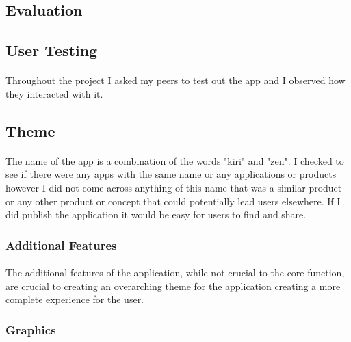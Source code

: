 \documentclass[11pt]{article}
\begin{document}
        \subsection{Evaluation}
            
                \paragraph{} 

    \subsection{User Testing}
    
           \paragraph{} Throughout the project I asked my peers to test out the app and I observed how they interacted with it. 
        


    
    \subsection{Theme}
        
        \paragraph{}
        The name of the app is a combination of the words "kiri" and "zen". I checked to see if there were any apps with the same name or any applications or products however I did not come across anything of this name that was a similar product or any other product or concept that could potentially lead users elsewhere. If I did publish the application it would be easy for users to find and share. 

        \subsubsection{Additional Features}
        \paragraph{}
        The additional features of the application, while not crucial to the core function, are crucial to creating an overarching theme for the application creating a more complete experience for the user.    
        
         \subsubsection{Graphics}
    
\end{document}
